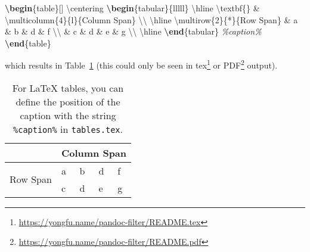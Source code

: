 \documentclass[
]{article}
\newenvironment{Shaded}{}{}
\newcommand{\CommentTok}[1]{\textcolor[rgb]{0.38,0.63,0.69}{\textit{#1}}}
\newcommand{\ExtensionTok}[1]{#1}
\newcommand{\FunctionTok}[1]{\textcolor[rgb]{0.02,0.16,0.49}{#1}}
\newcommand{\KeywordTok}[1]{\textcolor[rgb]{0.00,0.44,0.13}{\textbf{#1}}}
\newcommand{\NormalTok}[1]{#1}
\newcommand{\OperatorTok}[1]{\textcolor[rgb]{0.40,0.40,0.40}{#1}}
\DeclareRobustCommand{\href}[2]{#2\footnote{\url{#1}}}
\begin{document}
\begin{Shaded}
\begin{Highlighting}[]
\KeywordTok{\textbackslash{}begin}\NormalTok{\{}\ExtensionTok{table}\NormalTok{\}[]}
    \FunctionTok{\textbackslash{}centering}
    \KeywordTok{\textbackslash{}begin}\NormalTok{\{}\ExtensionTok{tabular}\NormalTok{\}\{lllll\}}
        \FunctionTok{\textbackslash{}hline}
        \FunctionTok{\textbackslash{}textbf}\NormalTok{\{\} }\OperatorTok{\&} \FunctionTok{\textbackslash{}multicolumn}\NormalTok{\{4\}\{l\}\{Column Span\} }\FunctionTok{\textbackslash{}\textbackslash{}} \FunctionTok{\textbackslash{}hline}
        \FunctionTok{\textbackslash{}multirow}\NormalTok{\{2\}\{*\}\{Row Span\} }\OperatorTok{\&}\NormalTok{ a }\OperatorTok{\&}\NormalTok{ b }\OperatorTok{\&}\NormalTok{ d }\OperatorTok{\&}\NormalTok{ f }\FunctionTok{\textbackslash{}\textbackslash{}}
         \OperatorTok{\&}\NormalTok{ c }\OperatorTok{\&}\NormalTok{ d }\OperatorTok{\&}\NormalTok{ e }\OperatorTok{\&}\NormalTok{ g }\FunctionTok{\textbackslash{}\textbackslash{}} \FunctionTok{\textbackslash{}hline}
        \KeywordTok{\textbackslash{}end}\NormalTok{\{}\ExtensionTok{tabular}\NormalTok{\}}
    \CommentTok{\%caption\%}
\KeywordTok{\textbackslash{}end}\NormalTok{\{}\ExtensionTok{table}\NormalTok{\}}
\end{Highlighting}
\end{Shaded}

which results in Table~\ref{tbl:custom-caption-position} (this could
only be seen in \href{https://yongfu.name/pandoc-filter/README.tex}{tex}
or \href{https://yongfu.name/pandoc-filter/README.pdf}{PDF} output).

\begin{table}[]
    \centering
    \begin{tabular}{lllll}
        \hline
        \textbf{} & \multicolumn{4}{l}{Column Span} \\ \hline
        \multirow{2}{*}{Row Span} & a & b & d & f \\
         & c & d & e & g \\ \hline
        \end{tabular}
    \caption{\label{tbl:custom-caption-position}For LaTeX tables, you can define the position of the caption with the string \texttt{\%caption\%} in \texttt{tables.tex}.}
\end{table}
\end{document}
